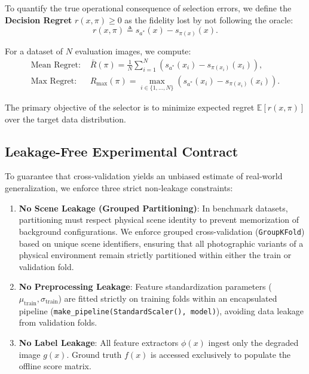 \documentclass[journal]{IEEEtran}
\begin{document}
To quantify the true operational consequence of selection errors, we define the \textbf{Decision Regret} $r(x, \pi) \ge 0$ as the fidelity lost by not following the oracle:
\begin{equation}
r(x, \pi) \triangleq s_{a^*}(x) - s_{\pi(x)}(x).
\label{eq:regret_definition}
\end{equation}

For a dataset of $N$ evaluation images, we compute:
\begin{align}
\text{Mean Regret: } & \bar{R}(\pi) = \frac{1}{N} \sum_{i=1}^N \left( s_{a^*}(x_i) - s_{\pi(x_i)}(x_i) \right), \label{eq:mean_regret} \\
\text{Max Regret: } & R_{\max}(\pi) = \max_{i \in \{1,\dots,N\}} \left( s_{a^*}(x_i) - s_{\pi(x_i)}(x_i) \right). \label{eq:max_regret}
\end{align}

The primary objective of the selector is to minimize expected regret $\mathbb{E}[r(x, \pi)]$ over the target data distribution.

\subsection{Leakage-Free Experimental Contract}
To guarantee that cross-validation yields an unbiased estimate of real-world generalization, we enforce three strict non-leakage constraints:
\begin{enumerate}
    \item \textbf{No Scene Leakage (Grouped Partitioning)}: In benchmark datasets, partitioning must respect physical scene identity to prevent memorization of background configurations. We enforce grouped cross-validation (\texttt{GroupKFold}) based on unique scene identifiers, ensuring that all photographic variants of a physical environment remain strictly partitioned within either the train or validation fold.
    \item \textbf{No Preprocessing Leakage}: Feature standardization parameters ($\mu_{\text{train}}, \sigma_{\text{train}}$) are fitted strictly on training folds within an encapsulated pipeline (\texttt{make\_pipeline(StandardScaler(), model)}), avoiding data leakage from validation folds.
    \item \textbf{No Label Leakage}: All feature extractors $\phi(x)$ ingest only the degraded image $g(x)$. Ground truth $f(x)$ is accessed exclusively to populate the offline score matrix.
\end{enumerate}
\end{document}

